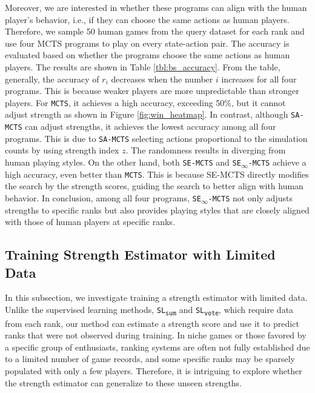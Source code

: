 Moreover, we are interested in whether these programs can align with the human player's behavior, i.e., if they can choose the same actions as human players.
Therefore, we sample 50 human games from the query dataset for each rank and use four MCTS programs to play on every state-action pair.
The accuracy is evaluated based on whether the programs choose the same actions as human players.
The results are shown in Table \ref{tbl:bs_accuracy}.
From the table, generally, the accuracy of $r_i$ decreases when the number $i$ increases for all four programs.
This is because weaker players are more unpredictable than stronger players.
For \texttt{MCTS}, it achieves a high accuracy, exceeding 50\%, but it cannot adjust strength as shown in Figure \ref{fig:win_heatmap}.
In contrast, although \texttt{SA-MCTS} can adjust strengths, it achieves the lowest accuracy among all four programs.
This is due to \texttt{SA-MCTS} selecting actions proportional to the simulation counts by using strength index $z$.
The randomness results in diverging from human playing styles.
On the other hand, both \texttt{SE-MCTS} and \texttt{SE\textsubscript{$\infty$}-MCTS} achieve a high accuracy, even better than \texttt{MCTS}.
This is because SE-MCTS directly modifies the search by the strength scores, guiding the search to better align with human behavior. 
In conclusion, among all four programs, \texttt{SE\textsubscript{$\infty$}-MCTS} not only adjusts strengths to specific ranks but also provides playing styles that are closely aligned with those of human players at specific ranks.


\subsection{Training Strength Estimator with Limited Data}
\label{subsec:exp_few_rank}
In this subsection, we investigate training a strength estimator with limited data.
Unlike the supervised learning methods, \texttt{SL\textsubscript{sum}} and \texttt{SL\textsubscript{vote}}, which require data from each rank, our method can estimate a strength score and use it to predict ranks that were not observed during training.
In niche games or those favored by a specific group of enthusiasts, ranking systems are often not fully established due to a limited number of game records, and some specific ranks may be sparsely populated with only a few players.
Therefore, it is intriguing to explore whether the strength estimator can generalize to these unseen strengths.


